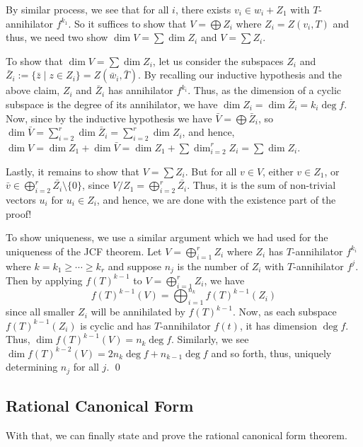 \documentclass[
]{article}
\theoremstyle{definition}
\theoremstyle{definition}
\begin{document}
By similar process, we see that for all \(i\), there exists
\(v_i \in w_i + Z_1\) with \(T\)-annihilator \(f^{k_1}\). So it suffices
to show that \(V = \bigoplus Z_i\) where \(Z_i = Z(v_i, T)\) and thus,
we need two show \(\dim V = \sum \dim Z_i\) and \(V = \sum Z_i\).

To show that \(\dim V = \sum \dim Z_i\), let us consider the subspaces
\(Z_i\) and
\(\bar{Z}_i := \{\bar{z} \mid z \in Z_i\} = Z(\bar{w}_i, \bar{T})\). By
recalling our inductive hypothesis and the above claim, \(Z_i\) and
\(\bar{Z}_i\) has annihilator \(f^{k_i}\). Thus, as the dimension of a
cyclic subspace is the degree of its annihilator, we have
\(\dim Z_i = \dim \bar{Z}_i = k_i \deg f\). Now, since by the inductive
hypothesis we have \(\bar{V} = \bigoplus \bar{Z}_i\), so
\(\dim \bar{V} =  \sum_{i = 2}^r \dim \bar{Z}_i = \sum_{i = 2}^r \dim Z_i\),
and hence,
\(\dim V = \dim Z_1 + \dim \bar{V} = \dim Z_1 + \sum \dim_{i = 2}^r Z_i =  \sum \dim Z_i\).

Lastly, it remains to show that \(V = \sum Z_i\). But for all
\(v \in V\), either \(v \in Z_1\), or
\(\bar{v} \in \bigoplus_{i = 2}^r \bar{Z_i} \setminus \{0\}\), since
\(V / Z_1 = \bigoplus_{i = 2}^r \bar{Z_i}\). Thus, it is the sum of
non-trivial vectors \(u_i\) for \(u_i \in Z_i\), and hence, we are done
with the existence part of the proof!

To show uniqueness, we use a similar argument which we had used for the
uniqueness of the JCF theorem. Let \(V = \bigoplus_{i = 1}^r Z_i\) where
\(Z_i\) has \(T\)-annihilator \(f^{k_i}\) where
\(k = k_1 \ge \cdots \ge k_r\) and suppose \(n_j\) is the number of
\(Z_i\) with \(T\)-annihilator \(f^j\). Then by applying
\(f(T)^{k - 1}\) to \(V = \bigoplus_{i = 1}^r Z_i\), we have
\[f(T)^{k - 1}(V) = \bigoplus_{i = 1}^{n_k} f(T)^{k - 1}(Z_i)\] since
all smaller \(Z_i\) will be annihilated by \(f(T)^{k - 1}\). Now, as
each subspace \(f(T)^{k - 1}(Z_i)\) is cyclic and has \(T\)-annihilator
\(f(t)\), it has dimension \(\deg f\). Thus,
\(\dim f(T)^{k - 1}(V) = n_k \deg f\). Similarly, we see
\(\dim f(T)^{k - 2}(V) = 2 n_k \deg f + n_{k - 1} \deg f\) and so forth,
thus, uniquely determining \(n_j\) for all \(j\). \qed

\hypertarget{rational-canonical-form}{%
\subsection{Rational Canonical Form}\label{rational-canonical-form}}

With that, we can finally state and prove the rational canonical form
theorem.
\end{document}
